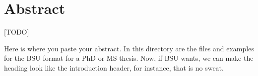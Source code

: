 \chapter*{Abstract}

[TODO]

Here is where you paste your abstract. In this directory are the
files and examples for the BSU format for a PhD or MS thesis. Now, 
if BSU wants, we can make the heading look like the introduction 
header, for instance, that is no sweat.



